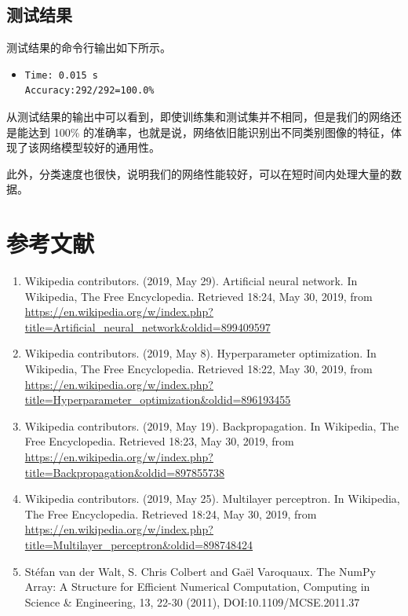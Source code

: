 \documentclass[a4paper, 12pt]{article}
\begin{document}
\subsection{测试结果}
测试结果的命令行输出如下所示。

\begin{itemize}[label={},leftmargin=2em]
\item \begin{lstlisting}[style=plainText,caption={测试结果的输出}]
Time: 0.015 s
Accuracy:292/292=100.0%
\end{lstlisting}
\end{itemize}

从测试结果的输出中可以看到，即使训练集和测试集并不相同，但是我们的网络还是能达到 100\% 的准确率，也就是说，网络依旧能识别出不同类别图像的特征，体现了该网络模型较好的通用性。

此外，分类速度也很快，说明我们的网络性能较好，可以在短时间内处理大量的数据。

\newpage

\section{参考文献}

\begin{enumerate}
\item Wikipedia contributors. (2019, May 29). Artificial neural network. In Wikipedia, The Free Encyclopedia. Retrieved 18:24, May 30, 2019, from \url{https://en.wikipedia.org/w/index.php?title=Artificial_neural_network&oldid=899409597}

\item Wikipedia contributors. (2019, May 8). Hyperparameter optimization. In Wikipedia, The Free Encyclopedia. Retrieved 18:22, May 30, 2019, from \url{https://en.wikipedia.org/w/index.php?title=Hyperparameter_optimization&oldid=896193455}

\item Wikipedia contributors. (2019, May 19). Backpropagation. In Wikipedia, The Free Encyclopedia. Retrieved 18:23, May 30, 2019, from \url{https://en.wikipedia.org/w/index.php?title=Backpropagation&oldid=897855738}

\item Wikipedia contributors. (2019, May 25). Multilayer perceptron. In Wikipedia, The Free Encyclopedia. Retrieved 18:24, May 30, 2019, from \url{https://en.wikipedia.org/w/index.php?title=Multilayer_perceptron&oldid=898748424}

\item Stéfan van der Walt, S. Chris Colbert and Gaël Varoquaux. The NumPy Array: A Structure for Efficient Numerical Computation, Computing in Science \& Engineering, 13, 22-30 (2011), DOI:10.1109/MCSE.2011.37
\end{enumerate}
\end{document}
